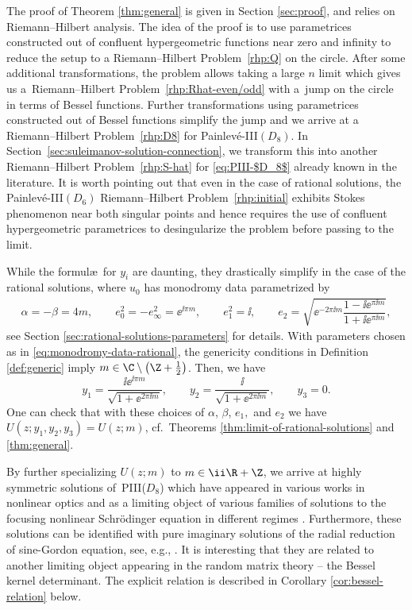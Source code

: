 The proof of Theorem \ref{thm:general} is given in Section \ref{sec:proof}, and relies on Riemann--Hilbert analysis. The idea of the proof is to use parametrices constructed out of confluent hypergeometric functions near zero and infinity to reduce the setup to a Riemann--Hilbert Problem~\ref{rhp:Q} on the circle. After some additional transformations, the problem allows taking a large $n$ limit which gives us a~Riemann--Hilbert Problem~\ref{rhp:Rhat-even/odd} with a~jump on the circle in terms of Bessel functions. Further transformations using parametrices constructed out of Bessel functions simplify the jump and we arrive at a Riemann--Hilbert Problem~\ref{rhp:D8} for Painlev\'e-III$(D_8)$. In Section~\ref{sec:suleimanov-solution-connection}, we transform this into another Riemann--Hilbert Problem~\ref{rhp:S-hat} for \eqref{eq:PIII-$D_8$} already known in the literature. It is worth pointing out that even in the case of rational solutions, the Painlev\'e-III$(D_6)$ Riemann--Hilbert Problem~\ref{rhp:initial} exhibits Stokes phenomenon near both singular points \cite{BMS18} and hence requires the use of confluent hypergeometric parametrices to desingularize the problem before passing to the limit.

While the formul\ae\ for $y_i$ are daunting, they drastically simplify in the case of the rational solutions, where $u_0$ has monodromy data parametrized by
\begin{gather}
 \alpha = -\beta = 4m, \qquad e_0^2 = -e_\infty^2 = \ee^{\ii \pi m},\qquad
 e_1^2 = \ii, \qquad
 e_2 = \sqrt{\ee^{-2\pi \ii m}\dfrac{1 - \ii \ee^{\pi \ii m}}{1 + \ii \ee^{\pi \ii m}}},
\label{eq:monodromy-data-rational}
\end{gather}
see Section \ref{sec:rational-solutions-parameters} for details. With parameters chosen as in \eqref{eq:monodromy-data-rational}, the genericity conditions in Definition \ref{def:generic} imply $m \in \C \setminus \big(\Z + \frac{1}{2}\big)$. Then, we have
\[
y_1 = \frac{\ii \ee^{\ii\pi m}}{\sqrt{1+ \ee^{2\pi \ii m}}}, \qquad y_2 = \frac{\ii }{\sqrt{1+ \ee^{2\pi \ii m}}}, \qquad y_3 = 0.
\]
One can check that with these choices of $\alpha$, $\beta$, $e_1,$ and $e_2$ we have $U(z;y_1,y_2,y_3) = U(z;m)$, cf.\ Theorems \ref{thm:limit-of-rational-solutions} and \ref{thm:general}.

By further specializing $U(z;m)$ to $m \in \ii\R+ \Z$, we arrive at highly symmetric solutions of~PIII($D_8$) which have appeared in various works in nonlinear optics \cite{suleimanov} and as a limiting object of various families of solutions to the focusing nonlinear Schr\"odinger equation in different regimes \cite{MR4007631, BLM20}. Furthermore, these solutions can be identified with pure imaginary solutions of the radial reduction of sine-Gordon equation, see, e.g., \cite[Chapter 13]{FIKN}. It is interesting that they are related to another limiting object appearing in the random matrix theory -- the Bessel kernel determinant. The explicit relation is described in Corollary \ref{cor:bessel-relation} below.

